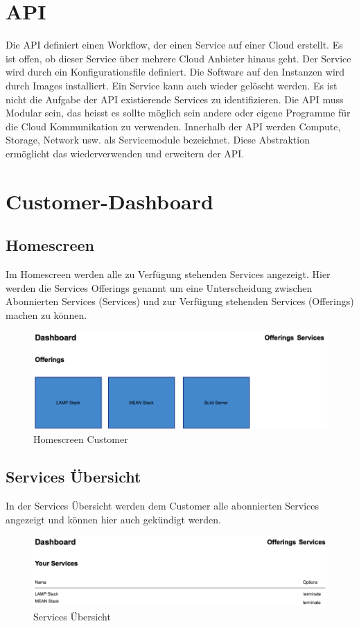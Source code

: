 \section{API}
Die API definiert einen Workflow, der einen Service auf einer Cloud erstellt. Es ist offen, ob 
dieser Service über mehrere Cloud Anbieter hinaus geht. Der Service wird durch 
ein Konfigurationsfile definiert. Die Software auf den Instanzen wird durch Images installiert.
 Ein Service kann auch wieder gelöscht werden.
 Es ist nicht die Aufgabe der API existierende Services zu identifizieren. 
 Die API muss Modular sein, das heisst es sollte möglich sein andere oder eigene 
 Programme für die Cloud Kommunikation zu verwenden. Innerhalb der API 
 werden Compute, Storage, Network usw. als Servicemodule bezeichnet. 
 Diese Abstraktion ermöglicht das wiederverwenden und erweitern der API.
\newpage
\section{Customer-Dashboard}
\subsection{Homescreen}
Im Homescreen werden alle zu 
Verfügung stehenden Services angezeigt.
Hier werden die Services Offerings genannt um eine Unterscheidung zwischen 
Abonnierten Services (Services) und zur Verfügung stehenden Services (Offerings) 
machen zu können.

\begin{figure}[!htbp]
\includegraphics[width=\textwidth]{./04_Anforderungen/images/homescreen_customer}
\caption{Homescreen Customer}
\end{figure}

\subsection{Services Übersicht}
In der Services Übersicht werden dem Customer alle abonnierten Services 
angezeigt und können hier auch gekündigt werden.
\newline
\begin{figure}[!htbp]
\includegraphics[width=\textwidth]{./04_Anforderungen/images/services_overview}
\caption{Services Übersicht}
\end{figure}

